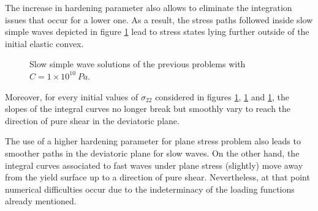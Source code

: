 The increase in hardening parameter also allows to eliminate the integration issues that occur for a lower one.
As a result, the stress paths followed inside slow simple waves depicted in figure \ref{fig:slow_H} lead to stress states lying further outside of the initial elastic convex.
\begin{figure}[h!]
  \centering
  { \label{subfig:slow_H1}}
  { \label{subfig:slow_H2}}
  { \label{subfig:slow_H3}}
  
  \caption{Slow simple wave solutions of the previous problems with $C=1\times10^{10} \: Pa$.}
  \label{fig:slow_H}
\end{figure}
Moreover, for every initial values of $\sigma_{22}$ considered in figures \ref{fig:slow_H}, \ref{fig:slow_H} and \ref{fig:slow_H}, the slopes of the integral curves no longer break but smoothly vary to reach the direction of pure shear in the deviatoric plane.

\begin{remark}
  The use of a higher hardening parameter for plane stress problem also leads to smoother paths in the deviatoric plane for slow waves.
  On the other hand, the integral curves associated to fast waves under plane stress (slightly) move away from the yield surface up to a direction of pure shear.
  Nevertheless, at that point numerical difficulties occur due to the indeterminacy of the loading functions already mentioned.
\end{remark}


